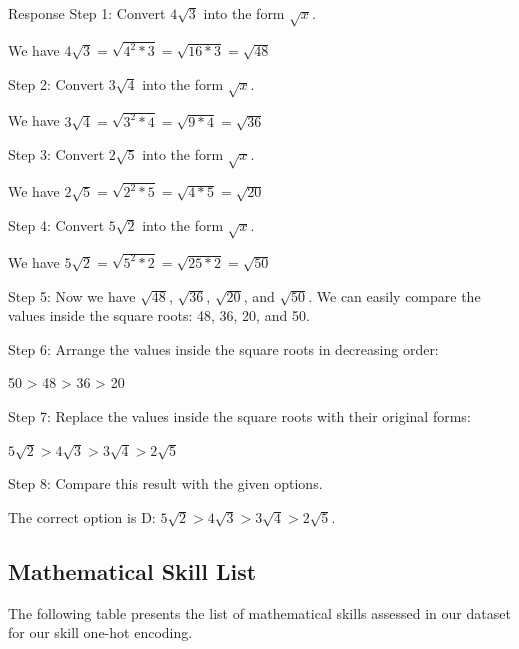 \documentclass[
    a4paper, %
    10pt, %
    twoside, %
]{LTJournalArticle}
\begin{document}
\begin{llmbox}{Response}
    Step 1: Convert $4\sqrt3$ into the form $\sqrt{x}$.

    We have $4\sqrt3 = \sqrt{4^2 * 3} = \sqrt{16 * 3} = \sqrt{48}$
    
    \vspace{1em}

    Step 2: Convert $3\sqrt4$ into the form $\sqrt{x}$.

    We have $3\sqrt4 = \sqrt{3^2 * 4} = \sqrt{9 * 4} = \sqrt{36}$
    
    \vspace{1em}

    Step 3: Convert $2\sqrt5$ into the form $\sqrt{x}$.

    We have $2\sqrt5 = \sqrt{2^2 * 5} = \sqrt{4 * 5} = \sqrt{20}$
    
    \vspace{1em}

    Step 4: Convert $5\sqrt2$ into the form $\sqrt{x}$.

    We have $5\sqrt2 = \sqrt{5^2 * 2} = \sqrt{25 * 2} = \sqrt{50}$
    
    \vspace{1em}

    Step 5: Now we have $\sqrt{48}$, $\sqrt{36}$, $\sqrt{20}$, and $\sqrt{50}$. We can easily compare the values inside the square roots: 48, 36, 20, and 50.

    \vspace{1em}

    Step 6: Arrange the values inside the square roots in decreasing order:

    50 > 48 > 36 > 20

    \vspace{1em}

    Step 7: Replace the values inside the square roots with their original forms:

    $5\sqrt2 > 4\sqrt3 > 3\sqrt4 > 2\sqrt5$

    \vspace{1em}

    Step 8: Compare this result with the given options.

    The correct option is D: $5\sqrt2 > 4\sqrt3 > 3\sqrt4 > 2\sqrt5$.
\end{llmbox}

\subsection{Mathematical Skill List}
The following table presents the list of mathematical skills assessed in our dataset for our skill one-hot encoding.
\end{document}
